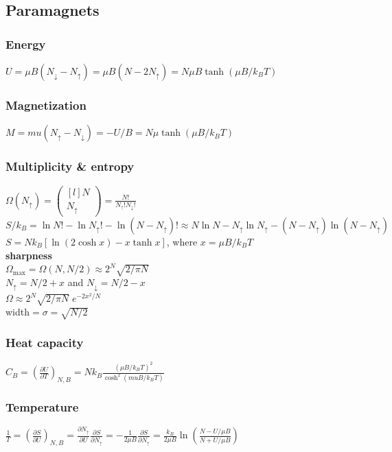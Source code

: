 \documentclass[letterpaper,landscape,10pt]{article}
\begin{document}
{\begin{multicols}{4}
	\subsection*{Paramagnets}
	\subsubsection*{Energy}
	$U = \mu B(N_{\downarrow}-N_\uparrow) = \mu B(N-2N_\uparrow) = N\mu B \tanh(\mu B/k_BT)$
	\subsubsection*{Magnetization}
	$M = mu(N_\uparrow-N_\downarrow)=-U/B = N\mu \tanh(\mu B/k_BT)$
	\subsubsection*{Multiplicity \& entropy}
	  $\Omega(N_\uparrow)=\begin{pmatrix}[l]N\\N_\uparrow\end{pmatrix}=\frac{N!}{N_{\uparrow}!N_\downarrow!}$ \\
	  $S/k_B = \ln N! - \ln N_\uparrow! - \ln(N-N_\uparrow)! \approx N\ln N - N_\uparrow \ln N_\uparrow - (N-N_\uparrow)\ln(N-N_\uparrow)$ \\
	  $S = Nk_B\left[ \ln(2\cosh x)-x\tanh x \right]$, where $x=\mu B/k_BT$ \\
	  \textbf{sharpness} \\
	  $\Omega_{\textrm{max}} = \Omega(N,N/2)\approx 2^N \sqrt{2/\pi N}$ \\
	  $N_\uparrow = N/2+x$ and $N_\downarrow = N/2-x$ \\
	  $\Omega\approx 2^N \sqrt{2/\pi N} \; e^{-2x^2/N}$ \\
	  width$= \sigma = \sqrt{N/2}$

	\subsubsection*{Heat capacity}
	$C_B = \left( \frac{\partial U}{\partial T} \right)_{N,B} = Nk_B\frac{\left( \mu B / k_BT \right)^2}{\cosh^2\left( mu B/k_BT \right)}$
	\subsubsection*{Temperature}
	$\frac{1}{T} = (\frac{\partial S}{\partial U})_{N,B} = \frac{\partial N_\uparrow}{\partial U}\frac{\partial S}{\partial N_\uparrow} = -\frac{1}{2\mu B}\frac{\partial S}{\partial N_\uparrow} = \frac{k_B}{2\mu B}\ln\left( \frac{N-U/\mu B}{N+U/\mu B} \right)$ \\


\end{multicols}}
\end{document}
